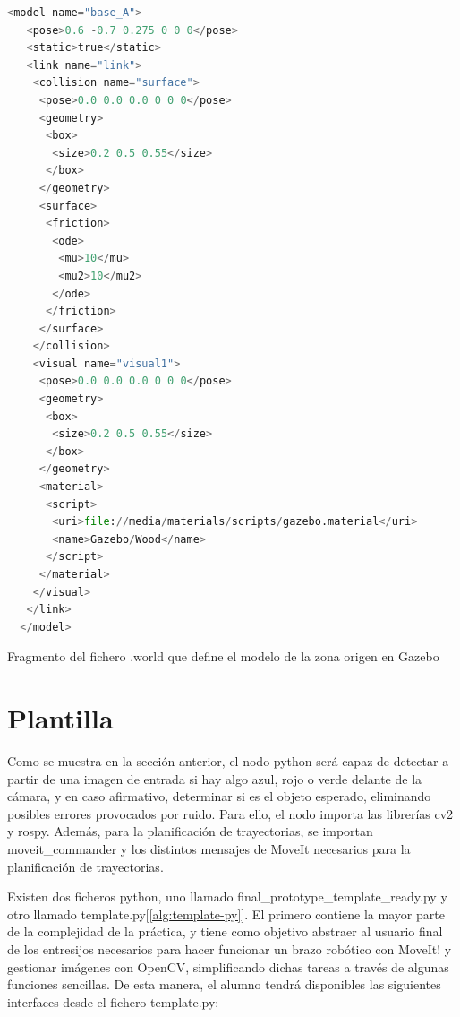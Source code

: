 \documentclass[12pt,spanish,chapterprefix, numbers=noenddot]{book}
\numberwithin{equation}{section}
\numberwithin{figure}{section}
\begin{document}
\vspace{20pt}
\begin{algorithm}[htb!]
	\begin{lstlisting}[breaklines=true,language=python]  
  <model name="base_A">
   <pose>0.6 -0.7 0.275 0 0 0</pose>
   <static>true</static>
   <link name="link">
    <collision name="surface">
     <pose>0.0 0.0 0.0 0 0 0</pose>
     <geometry>
      <box>
       <size>0.2 0.5 0.55</size>
      </box>
     </geometry>
     <surface>
      <friction>
       <ode>
        <mu>10</mu>
        <mu2>10</mu2>
       </ode>
      </friction>
     </surface>
    </collision>
    <visual name="visual1">
     <pose>0.0 0.0 0.0 0 0 0</pose>
     <geometry>
      <box>
       <size>0.2 0.5 0.55</size>
      </box>
     </geometry>
     <material>
      <script>
       <uri>file://media/materials/scripts/gazebo.material</uri>
       <name>Gazebo/Wood</name>
      </script>
     </material>
    </visual>
   </link>
  </model>
	\end{lstlisting}
\caption{\label{alg:model}Fragmento del fichero .world que define el modelo de la zona origen en Gazebo}
\end{algorithm}

\section{Plantilla}
Como se muestra en la sección anterior, el nodo python será capaz de detectar a partir de una imagen de entrada si hay algo azul, rojo o verde delante de la cámara, y en caso afirmativo, determinar si es el objeto esperado, eliminando posibles errores provocados por ruido. 
Para ello, el nodo importa las librerías cv2 y rospy. Además, para la planificación de trayectorias, se importan moveit\_commander y los distintos mensajes de MoveIt necesarios para la planificación de trayectorias.

Existen dos ficheros python, uno llamado final\_prototype\_template\_ready.py y otro llamado template.py[\ref{alg:template-py}]. 
El primero contiene la mayor parte de la complejidad de la práctica, y tiene como objetivo abstraer al usuario final de los entresijos necesarios para hacer funcionar un brazo robótico con MoveIt! y gestionar imágenes con OpenCV, simplificando dichas tareas a través de algunas funciones sencillas. 
De esta manera, el alumno tendrá disponibles las siguientes interfaces desde el fichero template.py: 
\end{document}
